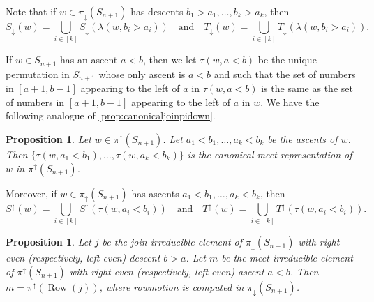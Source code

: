\documentclass[11pt]{amsart}
\newtheorem{proposition}[theorem]{Proposition}
\theoremstyle{definition}
\DeclareMathOperator{\row}{Row}
\begin{document}
Note that if $w\in \pi_\downarrow(S_{n+1})$ has descents $b_1>a_1,\ldots , b_k>a_k$, then 
\begin{equation}\label{Eq:union}
S_\downarrow(w)=\bigcup_{i\in[k]}S_\downarrow(\lambda(w,b_i>a_i))\quad\text{and}\quad T_\downarrow(w)=\bigcup_{i\in[k]}T_\downarrow(\lambda(w, b_i>a_i)).
\end{equation}

If $w\in S_{n+1}$ has an ascent $a<b$, then we let $\tau(w,a<b)$ be the unique permutation in $S_{n+1}$ whose only ascent is $a<b$ and such that the set of numbers in $[a+1,b-1]$ appearing to the left of $a$ in $\tau(w,a<b)$ is the same as the set of numbers in $[a+1,b-1]$ appearing to the left of $a$ in $w$. We have the following analogue of \cref{prop:canonicaljoinpidown}.

\begin{proposition}\label{prop:canonicalmeetpiup}
Let $w\in\pi^\uparrow(S_{n+1})$. Let $a_1<b_1, \ldots , a_k<b_k$ be the ascents of $w$. Then \linebreak $\{\tau(w,a_1<b_1),\ldots,\tau(w,a_k<b_k)\}$ is the canonical meet representation of $w$ in $\pi^\uparrow(S_{n+1})$.
\end{proposition}
 
Moreover, if $w\in \pi_\uparrow(S_{n+1})$ has ascents $a_1<b_1,\ldots , a_k<b_k$, then 
\begin{equation}\label{Eq:union2}
S^\uparrow(w)=\bigcup_{i\in[k]}S^\uparrow(\tau(w,a_i<b_i))\quad\text{and}\quad T^\uparrow(w)=\bigcup_{i\in[k]}T^\uparrow(\tau(w, a_i<b_i)).
\end{equation}

\begin{proposition}\label{cor:rowascentisdescent}
    Let $j$ be the join-irreducible element of $\pi_\downarrow(S_{n+1})$ with right-even (respectively, left-even) descent $b>a$. Let $m$ be the meet-irreducible element of $\pi^\uparrow(S_{n+1})$ with right-even (respectively, left-even) ascent $a<b$. Then $m=\pi^\uparrow(\row(j))$, where rowmotion is computed in $\pi_\downarrow(S_{n+1})$.
\end{proposition}
\end{document}
